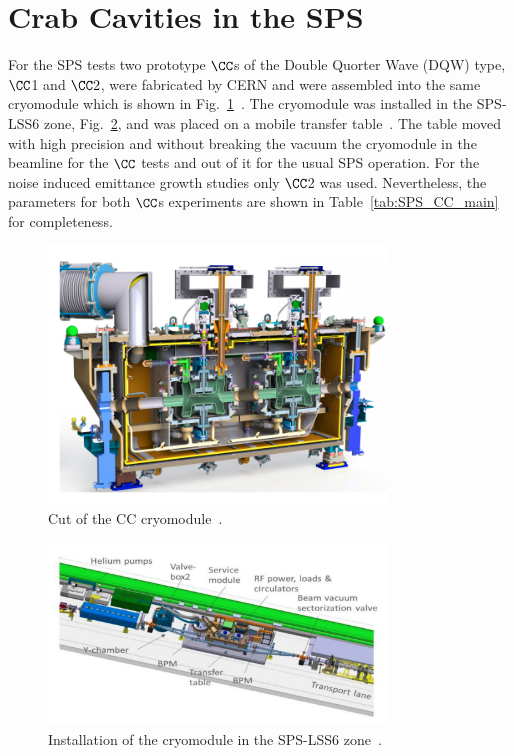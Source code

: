 \section{Crab Cavities in the SPS}\label{sec:CC_SPS_setup}

For the SPS tests two prototype $\CC$s of the Double Quorter Wave (DQW) type, $\CC$1 and $\CC2$, were fabricated by CERN and were assembled into the same cryomodule which is shown in Fig.~\ref{fig:DQW_cryomodule}~\cite{Zanoni:2017}. The cryomodule was installed in the SPS-LSS6 zone, Fig.~\ref{fig:CC_SPS_LSS6}, and was placed on a mobile transfer table~\cite{Calaga:2649807}. The table moved with high precision and without breaking the vacuum the cryomodule in the beamline for the $\CC$ tests and out of it for the usual SPS operation. For the noise induced emittance growth studies only $\CC$2 was used. Nevertheless, the parameters for both $\CC$s experiments are shown in Table~\ref{tab:SPS_CC_main} for completeness.


\begin{figure}[h]
   \centering         
   \includegraphics[width=0.8\textwidth]{images/Ch4/CC_cryomodule.png}
       \caption{Cut of the CC cryomodule~\cite{Zanoni:2017}.}
       \label{fig:DQW_cryomodule}
\end{figure}

\begin{figure}[h]
   \centering         
   \includegraphics[width=0.8\textwidth]{images/Ch4/CC_location_SPS_LSS6.png}
       \caption{Installation of the cryomodule in the SPS-LSS6 zone~\cite{Calaga:2649807}.}
       \label{fig:CC_SPS_LSS6}
\end{figure}

